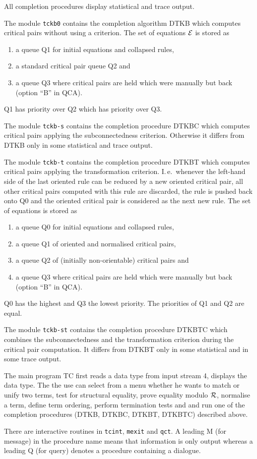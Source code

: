 All completion procedures display statistical and trace output.

The module {\tt tckb0} contains the completion algorithm DTKB which computes
critical pairs without using a criterion.
The set of equations $\cal E$ is stored as
\begin{enumerate}
 \item a queue Q1 for initial equations and collapsed rules,
 \item a standard critical pair queue Q2 and
 \item a queue Q3 where critical pairs are held which 
    were manually but back (option ``B'' in QCA).
\end{enumerate}
Q1 has priority over Q2 which has priority over Q3.

The module {\tt tckb-s} contains the completion procedure DTKBC which computes
critical pairs applying the subconnectedness criterion.
Otherwise it differs from DTKB only in some statistical and trace output.

The module {\tt tckb-t} contains the completion procedure DTKBT which computes
critical pairs applying the transformation criterion.
I.\,e.\ whenever the left-hand side of the last oriented rule can be reduced 
by a new oriented critical pair, all other critical pairs computed with this 
rule are discarded, the rule is pushed back onto Q0 and the oriented critical 
pair is considered as the next new rule.
The set of equations is stored as
\begin{enumerate}
 \item a queue Q0 for initial equations and collapsed rules,
 \item a queue Q1 of oriented and normalised critical pairs,
 \item a queue Q2 of (initially non-orientable) critical pairs and
 \item a  queue Q3 where critical pairs are held which 
    were manually but back (option ``B'' in QCA).
\end{enumerate}
Q0 has the  highest and Q3 the lowest priority.
The priorities  of Q1 and Q2 are equal.
 
The module {\tt tckb-st} contains the completion procedure DTKBTC which 
combines the subconnectedness and the transformation criterion during the 
critical pair computation.
It differs from DTKBT only in some statistical and in some trace output.

The main program TC %
first reads a data type from input stream 4, displays the data type.
The the use can select from a menu whether he wants to match or unify
two terms, test for structural equality, prove equality modulo $\cal R$,
normalise a term, define term ordering, perform termination tests and
and run one of the completion procedures (DTKB, DTKBC, DTKBT, DTKBTC)
described above.

There are interactive routines in {\tt tcint}, {\tt mexit} and {\tt qct}.
A leading M (for message) in the procedure name means that information is only
output whereas a leading Q (for query) denotes a procedure containing a 
dialogue.

